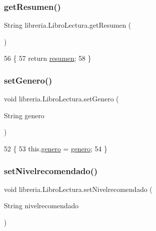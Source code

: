 \subsubsection{\texorpdfstring{get\+Resumen()}{getResumen()}}
{\footnotesize\ttfamily String libreria.\+Libro\+Lectura.\+get\+Resumen (\begin{DoxyParamCaption}{ }\end{DoxyParamCaption})\hspace{0.3cm}{\ttfamily [inline]}}


\begin{DoxyCode}
56                                \{
57         \textcolor{keywordflow}{return} \mbox{\hyperlink{classlibreria_1_1_libro_lectura_aadbf8eecd32ed6a6dee9202873762707}{resumen}};
58     \}
\end{DoxyCode}
\mbox{\label{classlibreria_1_1_libro_lectura_a14241c20d56f2def080df619d9f6debb}} 
\subsubsection{\texorpdfstring{set\+Genero()}{setGenero()}}
{\footnotesize\ttfamily void libreria.\+Libro\+Lectura.\+set\+Genero (\begin{DoxyParamCaption}\item[{String}]{genero }\end{DoxyParamCaption})\hspace{0.3cm}{\ttfamily [inline]}}


\begin{DoxyCode}
52                                          \{
53         this.\mbox{\hyperlink{classlibreria_1_1_libro_lectura_a165e12f15d25aab5fd957ebf42ad9458}{genero}} = \mbox{\hyperlink{classlibreria_1_1_libro_lectura_a165e12f15d25aab5fd957ebf42ad9458}{genero}};
54     \}
\end{DoxyCode}
\mbox{\label{classlibreria_1_1_libro_lectura_aa4701a76d8d8ba58ce628eda33426403}} 
\subsubsection{\texorpdfstring{set\+Nivelrecomendado()}{setNivelrecomendado()}}
{\footnotesize\ttfamily void libreria.\+Libro\+Lectura.\+set\+Nivelrecomendado (\begin{DoxyParamCaption}\item[{String}]{nivelrecomendado }\end{DoxyParamCaption})\hspace{0.3cm}{\ttfamily [inline]}}


